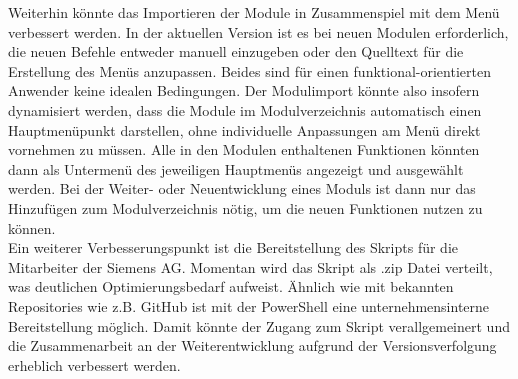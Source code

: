 Weiterhin könnte das Importieren der Module in Zusammenspiel mit dem Menü verbessert werden. In der aktuellen Version ist es bei neuen Modulen erforderlich, die neuen Befehle entweder manuell einzugeben oder den Quelltext für die Erstellung des Menüs anzupassen. Beides sind für einen funktional-orientierten Anwender keine idealen Bedingungen. Der Modulimport könnte also insofern dynamisiert werden, dass die Module im Modulverzeichnis automatisch einen Hauptmenüpunkt darstellen, ohne individuelle Anpassungen am Menü direkt vornehmen zu müssen. Alle in den Modulen enthaltenen Funktionen könnten dann als Untermenü des jeweiligen Hauptmenüs angezeigt und ausgewählt werden. Bei der Weiter- oder Neuentwicklung eines Moduls ist dann nur das Hinzufügen zum Modulverzeichnis nötig, um die neuen Funktionen nutzen zu können.\medskip\\
Ein weiterer Verbesserungspunkt ist die Bereitstellung des Skripts für die Mitarbeiter der Siemens AG. Momentan wird das Skript als .zip Datei verteilt, was deutlichen Optimierungsbedarf aufweist. Ähnlich wie mit bekannten Repositories wie z.B. GitHub ist mit der PowerShell eine unternehmensinterne Bereitstellung möglich. Damit könnte der Zugang zum Skript verallgemeinert und die Zusammenarbeit an der Weiterentwicklung aufgrund der Versionsverfolgung erheblich verbessert werden.
\begin{comment}
für breitgefächertere/allgemeinere Abfragen unabhängig vom Betriebssystem: Implementieren von SNMP\\
automatische Abfrage mittels Scheduling, anschließend Generieren des Berichts im HTML Format, Versenden als Email\\
Dashboard\\
PowerShell Universal \\
Unternehmensinternes Repository für Bereitstellung des Skripts denkbar\\
Look and Feel verbessern: Autovervollständigung (Historie) der Verbindungen mit vCenter z.B.\\
Modulimport weiter dynamisieren --> jedes Modul wird als Hauptmenüpunkt aufgenommen, die einzelnen Commandlets könnten Untermenüpunkte sein: \\
z.B: Systemabfrage heißt das Modul = Hauptmenü; hat die Cmdlets Get-Systemabfrage und Get-Processmonitor = Untermenüpunkte --> neue Module automatisch im Menü ohne Code anpassen zu müssen; einfachere Entwicklung

Halbautomatisches Abfragen --> Daten manuell aus dem vCenter exportieren und dann Bericht erstellen lassen, Problem Datenstruktur wahrscheinlich nicht gleich\\\\
mittels PowerShell Core in der Zukunft auch plattformunabhängiges Arbeiten
\\\\
ähnlich wie mit Windows Updates --> stärker in Richtung PCS 7 analysieren, Toolkit um PCS 7 Analyse erweitern?
\end{comment}
